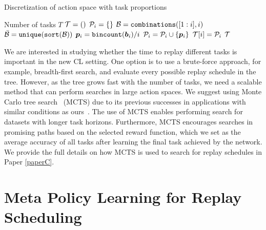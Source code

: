\begin{algorithm}[t]
	\caption{Discretization of action space with task proportions}
	\label{alg:action_space_discretization}
	\begin{algorithmic}[1]
		\Require Number of tasks $T$
		\State ${\mathcal{T}} = ()$ 
		\State ${\mathcal{P}}_i = \{\}$ 
		\State ${\mathcal{B}} = \texttt{combinations}([1:i], i)$ 
		\State $\bar{{\mathcal{B}}} = \texttt{unique}(\texttt{sort}({\mathcal{B}}))$ 
		\State ${\bm{p}}_i = \texttt{bincount}({\bm{b}}_i) / i$ 
		\State ${\mathcal{P}}_i = {\mathcal{P}}_i \cup \{ {\bm{p}}_i \}$ 
		\EndFor
		\State ${\mathcal{T}}[i] = {\mathcal{P}}_i$ 
		\EndFor
		\State \Return ${\mathcal{T}}$ 
	\end{algorithmic}
\end{algorithm}



We are interested in studying whether the time to replay different tasks is important in the new CL setting. One option is to use a brute-force approach, for example, breadth-first search, and evaluate every possible replay schedule in the tree. However, as the tree grows fast with the number of tasks, we need a scalable method that can perform searches in large action spaces. We suggest using Monte Carlo tree search~\cite{coulom2006efficient} (MCTS) due to its previous successes in applications with similar conditions as ours~\cite{browne2012survey, silver2016mastering, chaudhry2018feature}. The use of MCTS enables performing search for datasets with longer task horizons. Furthermore, MCTS encourages searches in promising paths based on the selected reward function, which we set as the average accuracy of all tasks after learning the final task achieved by the network. We provide the full details on how MCTS is used to search for replay schedules in Paper \ref{paperC}. 




\section{Meta Policy Learning for Replay Scheduling}
\label{sec:meta_policy_learning_for_replay_scheduling}

